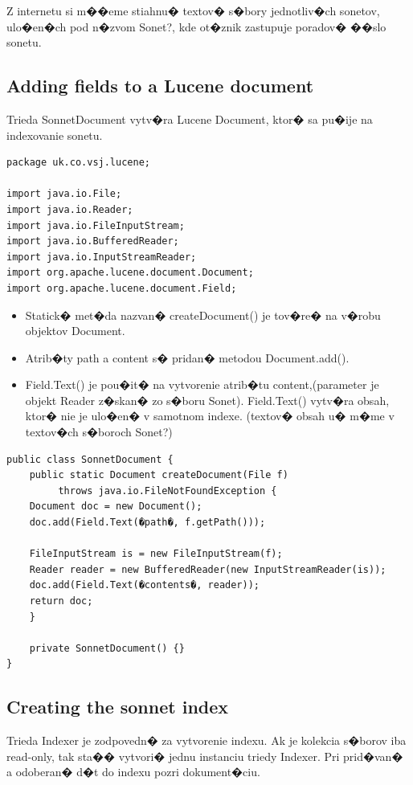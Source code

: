 \documentclass[11pt,a4paper]{article}
\begin{document}
Z internetu si m��eme stiahnu� textov� s�bory jednotliv�ch sonetov, ulo�en�ch pod n�zvom Sonet?, kde ot�znik zastupuje poradov� ��slo sonetu.

\subsection{Adding fields to a Lucene document}
Trieda SonnetDocument vytv�ra Lucene Document, ktor� sa pu�ije na indexovanie sonetu.

\begin{verbatim}
package uk.co.vsj.lucene;

import java.io.File;
import java.io.Reader;
import java.io.FileInputStream;
import java.io.BufferedReader;
import java.io.InputStreamReader;
import org.apache.lucene.document.Document;
import org.apache.lucene.document.Field;
\end{verbatim}

\begin{itemize}
\item Statick� met�da nazvan� createDocument() je tov�re� na v�robu objektov Document.
\item Atrib�ty path a content s� pridan� metodou Document.add().
\item Field.Text() je pou�it� na vytvorenie atrib�tu content,(parameter je objekt Reader z�skan� zo s�boru Sonet). Field.Text() vytv�ra obsah, ktor� nie je ulo�en� v samotnom indexe. (textov� obsah u� m�me v textov�ch s�boroch Sonet?)
\end{itemize}


\begin{verbatim}
public class SonnetDocument {
	public static Document createDocument(File f)
		 throws java.io.FileNotFoundException {
	Document doc = new Document();
	doc.add(Field.Text(�path�, f.getPath()));

	FileInputStream is = new FileInputStream(f);
	Reader reader = new BufferedReader(new InputStreamReader(is));
	doc.add(Field.Text(�contents�, reader));
	return doc;
	}

	private SonnetDocument() {}
}
\end{verbatim}

\subsection{Creating the sonnet index}
Trieda Indexer je zodpovedn� za vytvorenie indexu. Ak je kolekcia s�borov iba read-only, tak sta�� vytvori� jednu instanciu triedy Indexer. Pri prid�van� a odoberan� d�t do indexu pozri dokument�ciu.
\end{document}
